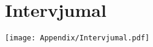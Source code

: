 \newpage
{}
\appendix
\chapter{Intervjumal}
\label{Intervjumal}
% 
\texttt{[image: Appendix/Intervjumal.pdf]}
\noindent
\vfill













